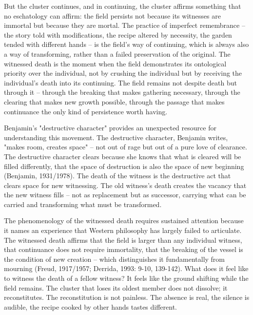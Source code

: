 But the cluster continues, and in continuing, the cluster affirms something that no eschatology can affirm: the field persists not because its witnesses are immortal but because they are mortal. The practice of imperfect remembrance -- the story told with modifications, the recipe altered by necessity, the garden tended with different hands -- is the field's way of continuing, which is always also a way of transforming, rather than a failed preservation of the original. The witnessed death is the moment when the field demonstrates its ontological priority over the individual, not by crushing the individual but by receiving the individual's death into its continuing. The field remains not despite death but through it -- through the breaking that makes gathering necessary, through the clearing that makes new growth possible, through the passage that makes continuance the only kind of persistence worth having.

Benjamin's "destructive character" provides an unexpected resource for understanding this movement. The destructive character, Benjamin writes, "makes room, creates space" -- not out of rage but out of a pure love of clearance. The destructive character clears because she knows that what is cleared will be filled differently, that the space of destruction is also the space of new beginning (Benjamin, 1931/1978). The death of the witness is the destructive act that clears space for new witnessing. The old witness's death creates the vacancy that the new witness fills -- not as replacement but as successor, carrying what can be carried and transforming what must be transformed.

The phenomenology of the witnessed death requires sustained attention because it names an experience that Western philosophy has largely failed to articulate. The witnessed death affirms that the field is larger than any individual witness, that continuance does not require immortality, that the breaking of the vessel is the condition of new creation -- which distinguishes it fundamentally from mourning (Freud, 1917/1957; Derrida, 1993: 9-10, 139-142). What does it feel like to witness the death of a fellow witness? It feels like the ground shifting while the field remains. The cluster that loses its oldest member does not dissolve; it reconstitutes. The reconstitution is not painless. The absence is real, the silence is audible, the recipe cooked by other hands tastes different.

